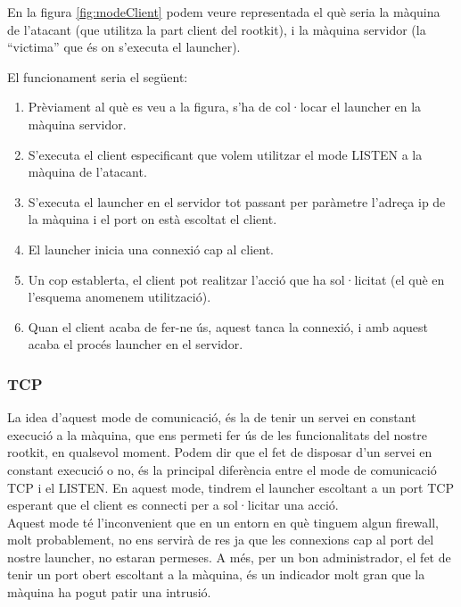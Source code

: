 En la figura \ref{fig:modeClient} podem veure representada el què seria la màquina de l'atacant (que utilitza la part client del rootkit),
i la màquina servidor (la ``victima'' que és on s'executa el launcher).

El funcionament seria el següent:
\begin{enumerate}
    \item Prèviament al què es veu a la figura, s'ha de col·locar el launcher en la màquina servidor.
    \item S'executa el client especificant que volem utilitzar el mode LISTEN a la màquina de l'atacant.
    \item S'executa el launcher en el servidor tot passant per paràmetre l'adreça ip de la màquina i el port on està escoltat
        el client.
    \item El launcher inicia una connexió cap al client.
    \item Un cop establerta, el client pot realitzar l'acció que ha sol·licitat (el què en l'esquema anomenem utilització).
    \item Quan el client acaba de fer-ne ús, aquest tanca la connexió, i amb aquest acaba el procés launcher en el servidor.
\end{enumerate}

\subsubsection{TCP}
La idea d'aquest mode de comunicació, és la de tenir un servei en constant execució a la màquina, que ens permeti
fer ús de les funcionalitats del nostre rootkit, en qualsevol moment. Podem dir que el fet de disposar d'un servei en constant 
execució o no, és la principal diferència entre el mode de comunicació TCP i el LISTEN. En aquest mode, tindrem el launcher 
escoltant a un port TCP esperant que el client es connecti per a sol·licitar una acció. \\

Aquest mode té l'inconvenient que en un entorn en què tinguem algun firewall, molt probablement, no ens 
servirà de res ja que les connexions cap al port del nostre launcher, no estaran permeses. A més, per un bon administrador, el 
fet de tenir un port obert escoltant a la màquina, és un indicador molt gran que la màquina ha pogut patir una intrusió. \\

